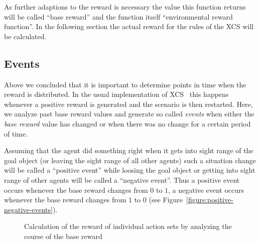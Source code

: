 As further adaptions to the reward is necessary the value this function returns will be called ``base reward'' and the function itself ``environmental reward function''. In the following section the actual reward for the rules of the XCS will be calculated. 

\subsection{Events}
\label{subsection:events}

Above we concluded that it is important to determine points in time when the reward is distributed. In the usual implementation of XCS~\cite{BW02} this happens whenever a positive reward is generated and the scenario is then restarted. Here, we analyze past base reward values and generate so called \emph{events} when either the \emph{base reward} value has changed or when there was no change for a certain period of time.

Assuming that the agent did something right when it gets into sight range of the goal object (or leaving the sight range of all other agents) such a situation change will be called a ``positive event'' while loosing the goal object or getting into sight range of other agents will be called a ``negative event''. Thus a positive event occurs whenever the base reward changes from $0$ to $1$, a negative event occurs whenever the base reward changes from $1$ to $0$ (see Figure~\ref{figure:positive-negative-events}).

\begin{figure*}[ht]
\caption{Calculation of the reward of individual action sets by analyzing the course of the base reward}\label{figure:experiment}
\end{figure*}


